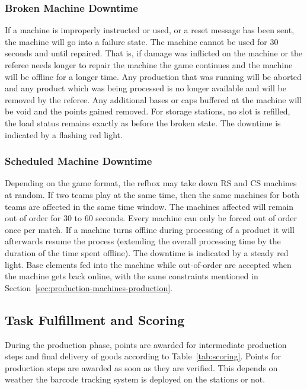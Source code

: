 \documentclass[12pt,twoside]{article}
\newcommand{\refsec}[1]{Section~\ref{#1}}
\newcommand{\reftab}[1]{Table~\ref{#1}}
\begin{document}
\subsubsection{Broken Machine Downtime}
\label{sec:broken-machine}
If a machine is improperly instructed or used, or a reset message has
been sent, the machine will go into a failure state. The machine cannot be
used for 30 seconds and until repaired.
That is, if damage was
inflicted on the machine or the referee needs longer to repair the
machine the game continues and the machine will be offline for a
longer time. Any production that was running will be aborted and any
product which was being processed is no longer available and will be
removed by the referee. Any additional bases or caps buffered at the machine
will be void and the points gained removed. For storage stations, no
slot is refilled, the load status remains exactly as before the broken
state. The downtime is indicated by a flashing red light.


\subsubsection{Scheduled Machine Downtime}
\label{sec:out-of-order}
Depending on the game format, the \ac{refbox} may take down \ac{RS} and \ac{CS}
machines at random. If two teams play at the same time, then the same machines
for both teams are affected in the same time window.
The machines affected will remain out of order for 30 to 60
seconds. Every machine can only be forced out of order once per
match. If a machine turns offline during processing of a product it will
afterwards resume the process (extending the overall processing time
by the duration of the time spent offline). The downtime is indicated by a
steady red light.
Base elements fed into the machine while out-of-order are
accepted when the machine gets back online, with the same constraints
mentioned in \refsec{sec:production-machines-production}.



\subsection{Task Fulfillment and Scoring}
\label{sec:production-scoring}
During the production phase, points are awarded for intermediate
production steps and final delivery of goods according to
\reftab{tab:scoring}.
Points for production steps are awarded as soon as they are verified.
This depends on weather the barcode tracking system is deployed on the
stations or not.
\end{document}

